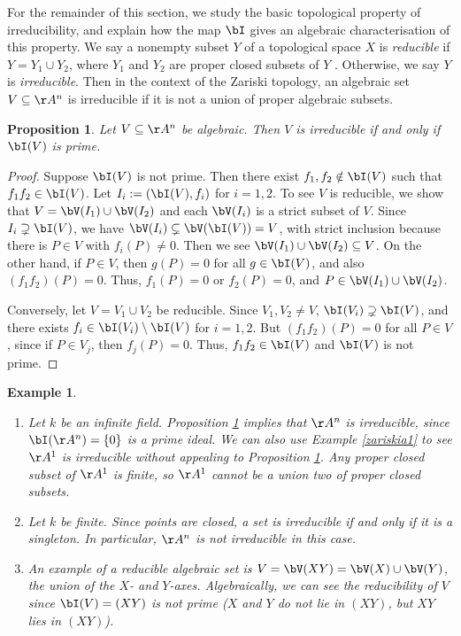 \documentclass[12pt]{amsart}
\theoremstyle{plain}
\newtheorem{proposition}[theorem]{Proposition}
\newtheorem{example}[theorem]{Example}
\begin{document}
For the remainder of this section, we study the basic topological property of irreducibility, and explain how the map $\bI$ gives an algebraic characterisation of this property.
We say a nonempty subset $Y$ of a topological space $X$ is \emph{reducible} if $Y = Y_1 \cup Y_2$, where $Y_1$ and $Y_2$ are proper closed subsets of $Y$ \cite[Chapter I]{Hartshorne77}.
Otherwise, we say $Y$ is \emph{irreducible}.
Then in the context of the Zariski topology, an algebraic set $V \subseteq \AA^n$ is irreducible if it is not a union of proper algebraic subsets.

\begin{proposition}\label{irreducibilityproposition}
Let $V \subseteq \AA^n$ be algebraic.
Then $V$ is irreducible if and only if $\bI(V)$ is prime.
\end{proposition}
\begin{proof}
Suppose $\bI(V)$ is not prime.
Then there exist $f_1, f_2 \notin \bI(V)$ such that $f_1 f_2 \in \bI(V)$.
Let $I_i := (\bI(V), f_i)$ for $i=1, 2$.
To see $V$ is reducible, we show that $V = \bV(I_1) \cup \bV(I_2)$ and each $\bV(I_i)$ is a strict subset of $V$.
Since $I_i \supsetneq \bI(V)$, we have $\bV(I_i) \subsetneq \bV(\bI(V)) = V$, with strict inclusion because there is $P \in V$ with $f_i(P) \ne 0$.
Then we see $\bV(I_1) \cup \bV(I_2) \subseteq V$.
On the other hand, if $P \in V$, then $g(P) = 0$ for all $g \in \bI(V)$, and also $(f_1 f_2)(P) = 0$.
Thus, $f_1(P) = 0$ or $f_2(P)=0$, and $P \in \bV(I_1) \cup \bV(I_2)$.

Conversely, let $V = V_1 \cup V_2$ be reducible.
Since $V_1, V_2 \ne V$, $\bI(V_i) \supsetneq \bI(V)$, and there exists $f_i \in \bI(V_i) \setminus \bI(V)$ for $i=1,2$.
But $(f_1 f_2)(P) = 0$ for all $P \in V$, since if $P \in V_j$, then $f_j(P) = 0$.
Thus, $f_1 f_2 \in \bI(V)$ and $\bI(V)$ is not prime.
\end{proof}

\begin{example}
\begin{enumerate}
\item
Let $k$ be an infinite field.
Proposition \ref{irreducibilityproposition} implies that $\AA^n$ is irreducible, since $\bI(\AA^n) = \{0\}$ is a prime ideal.
We can also use Example \ref{zariskia1} to see $\AA^1$ is irreducible without appealing to Proposition \ref{irreducibilityproposition}.
Any proper closed subset of $\AA^1$ is finite, so $\AA^1$ cannot be a union two of proper closed subsets.

\item
Let $k$ be finite.
Since points are closed, a set is irreducible if and only if it is a singleton.
In particular, $\AA^n$ is not irreducible in this case.

\item
An example of a reducible algebraic set is $V = \bV(XY) = \bV(X) \cup \bV(Y)$, the union of the $X$- and $Y$-axes.
Algebraically, we can see the reducibility of $V$ since $\bI(V) = (XY)$ is not prime
($X$ and $Y$ do not lie in $(XY)$, but $XY$ lies in $(XY)$).
\end{enumerate}
\end{example}
\end{document}
